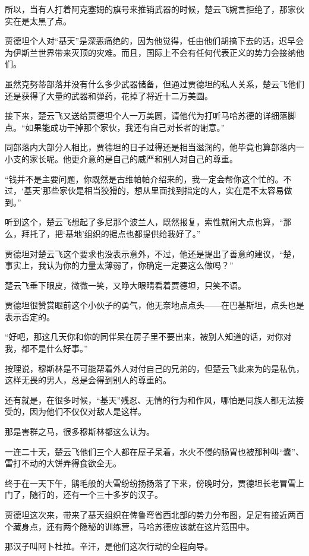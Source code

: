 所以，当有人打着阿克塞姆的旗号来推销武器的时候，楚云飞婉言拒绝了，那家伙实在是太黑了点。

贾德坦个人对“基天”是深恶痛绝的，因为他觉得，任由他们胡搞下去的话，迟早会为伊斯兰世界带来灭顶的灾难。而且，国际上不会有任何代表正义的势力会接纳他们。

虽然克努蒂部落并没有什么多少武器储备，但通过贾德坦的私人关系，楚云飞他们还是获得了大量的武器和弹药，花掉了将近十二万美圆。

接下来，楚云飞又送给贾德坦个人一万美圆，请他代为打听马哈苏德的详细落脚点。“如果能成功干掉那个家伙，我还有自己对长者的谢意。”

同部落内大部分人相比，贾德坦的日子过得还是相当滋润的，他毕竟也算部落内一小支的家长呢。他更介意的是自己的威严和别人对自己的尊重。

“钱并不是主要问题，你既然是古维帕帕介绍来的，我一定会帮你这个忙的。不过，‘基天’那些家伙是相当狡猾的，想从里面找到指定的人，实在是不太容易做到。”

听到这个，楚云飞想起了多尼那个波兰人，既然报复，索性就闹大点也算，“那么，拜托了，把‘基地’组织的据点也都提供给我好了。”

贾德坦对楚云飞这个要求也没表示意外，不过，他还是提出了善意的建议，“楚，事实上，我认为你的力量太薄弱了，你确定一定要这么做吗？”

楚云飞垂下眼皮，微微一笑，又睁大眼睛看着贾德坦，只笑不语。

贾德坦很赞赏眼前这个小伙子的勇气，他无奈地点点头——在巴基斯坦，点头也是表示否定的。

“好吧，那这几天你和你的同伴呆在房子里不要出来，被别人知道的话，对你对我，都不是什么好事。”

按理说，穆斯林是不可能帮着外人对付自己的兄弟的，但楚云飞此来为的是私仇，这样无畏的男人，总是会得到别人的尊重的。

还有就是，在很多时候，“基天”残忍、无情的行为和作风，哪怕是同族人都无法接受的，因为他们不仅仅对敌人是这样。

那是害群之马，很多穆斯林都这么认为。

一连二十天，楚云飞他们三个人都在屋子呆着，水火不侵的肠胃也被那种叫“囊”、雷打不动的大饼弄得食欲全无。

终于在一天下午，鹅毛般的大雪纷纷扬扬落了下来，傍晚时分，贾德坦长老冒雪上门了，随行的，还有一个三十多岁的汉子。

贾德坦这次来，带来了基天组织在俾鲁弯省西北部的势力分布图，足足有接近两百个藏身点，还有两个隐秘的训练营，马哈苏德应该就在这片范围中。

那汉子叫阿卜杜拉。辛汗，是他们这次行动的全程向导。

